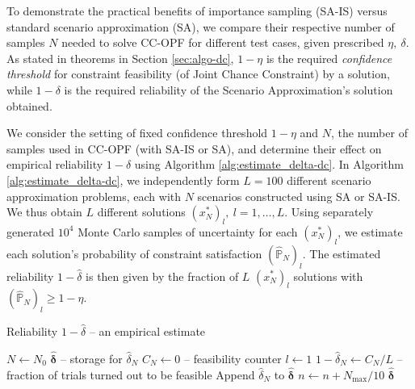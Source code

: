 To demonstrate the practical benefits of importance sampling (SA-IS) versus standard scenario approximation (SA), we compare their respective number of samples $N$ needed to solve CC-OPF for different test cases, given prescribed $\eta,~\delta$. As stated in theorems in Section \ref{sec:algo-dc}, $1-\eta$ is the required \emph{confidence threshold} for constraint feasibility (of Joint Chance Constraint) by a solution, while $1-\delta$ is the required reliability of the Scenario Approximation's solution obtained.


We consider the setting of fixed confidence threshold $1-\eta$ and $N$, the number of samples used in CC-OPF (with SA-IS or SA), and determine their effect on empirical reliability $1-\hat{\delta}$ using Algorithm \ref{alg:estimate_delta-dc}. In Algorithm \ref{alg:estimate_delta-dc}, we independently form $L=100$ different scenario approximation problems, each with $N$ scenarios constructed using SA or SA-IS. We thus obtain $L$ different solutions $(x^*_N)_l, ~ l=1, \dots, L$. Using separately generated $10^4$ Monte Carlo samples of uncertainty for each $(x^*_N)_l$, we estimate each solution's probability of constraint satisfaction $(\hat{\mathbb{P}}_N)_l$. The estimated reliability $1-\hat{\delta}$ is then given by the fraction of $L$ $(x^*_N)_l$ solutions with $(\hat{\mathbb{P}}_N)_l \geq 1 - \eta$. 

\begin{algorithm}[ht]
\caption{Reliability $1-\hat{\delta}$ -- an empirical estimate}\label{alg:estimate_delta-dc}
$N \gets N_0$\;
$\hat{ \boldsymbol \delta}$ -- storage for $\hat{\delta}_N$\;
{
     $C_N \gets 0$ -- feasibility counter\;
     $l \gets 1$\;
    $1-\hat{\delta}_N \gets C_N / L$ -- fraction of trials turned out to be feasible \;
    Append $\hat{\delta}_N$ to $\hat{ \boldsymbol \delta}$ \;
    $n  \gets n + N_{\max}/ 10$\;
}
\Return $\hat{ \boldsymbol \delta}$
\end{algorithm}

